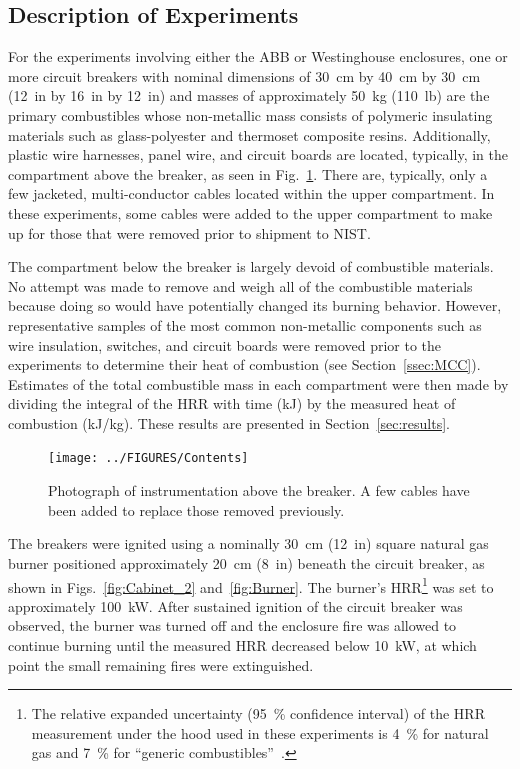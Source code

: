 \subsection{Description of Experiments}

For the experiments involving either the ABB or Westinghouse enclosures, one or more circuit breakers with nominal dimensions of 30~cm by 40~cm by 30~cm (12~in by 16~in by 12~in) and masses of approximately 50~kg (110~lb) are the primary combustibles whose non-metallic mass consists of polymeric insulating materials such as glass-polyester and thermoset composite resins. Additionally, plastic wire harnesses, panel wire, and circuit boards are located, typically, in the compartment above the breaker, as seen in Fig.~\ref{fig:Contents}. There are, typically, only a few jacketed, multi-conductor cables located within the upper compartment. In these experiments, some cables were added to the upper compartment to make up for those that were removed prior to shipment to NIST.

The compartment below the breaker is largely devoid of combustible materials. No attempt was made to remove and weigh all of the combustible materials because doing so would have potentially changed its burning behavior. However, representative samples of the most common non-metallic components such as wire insulation, switches, and circuit boards were removed prior to the experiments to determine their heat of combustion (see Section~\ref{ssec:MCC}). Estimates of the total combustible mass in each compartment were then made by dividing the integral of the HRR with time (kJ) by the measured heat of combustion (kJ/kg). These results are presented in Section~\ref{sec:results}.

\begin{figure}[t]
\centering
\texttt{[image: ../FIGURES/Contents]}
\caption[Photograph of instrumentation above the breaker] {Photograph of instrumentation above the breaker. A few cables have been added to replace those removed previously.}
\label{fig:Contents}
\end{figure}

The breakers were ignited using a nominally 30~cm (12~in) square natural gas burner positioned approximately 20~cm (8~in) beneath the circuit breaker, as shown in Figs.~\ref{fig:Cabinet_2} and~\ref{fig:Burner}. The burner's HRR\footnote{The relative expanded uncertainty (95~\% confidence interval) of the HRR measurement under the hood used in these experiments is 4~\% for natural gas and 7~\% for ``generic combustibles''~\cite{bryant2019nist}.} was set to approximately 100~kW. After sustained ignition of the circuit breaker was observed, the burner was turned off and the enclosure fire was allowed to continue burning until the measured HRR decreased below 10~kW, at which point the small remaining fires were extinguished.

